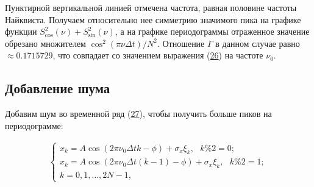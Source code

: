 \documentclass[12pt]{article}
\newcommand{\hl}[1]{(\hyperlink{eq:#1}{#1})}
\newcommand{\sd}[1]{\hypertarget{skip:#1}{\vspace{-10pt}}}
\begin{document}
\vspace{10pt}
\begin{minipage}[h]{\linewidth}
\end{minipage}

\vspace{\baselineskip}

Пунктирной вертикальной линией отмечена частота, равная половине частоты Найквиста. Получаем относительно нее симметрию значимого пика на графике функции $ S_{\cos}^2(\nu) + S_{\sin}^2(\nu) $, а на графике периодограммы отраженное значение обрезано множителем $ \cos^2(\pi \nu \Delta t) / N^2 $. Отношение $ \Gamma $ в данном случае равно $ \approx 0.1715729 $, что совпадает со значением выражения \hl{26} на частоте $ \nu_{0} $.

\subsection{Добавление шума}

Добавим шум во временной ряд \hl{27}, чтобы получить больше пиков на периодограмме:

\sd{29}
\begin{gather}
    \begin{cases}
        x_k = A \cos(2 \pi \nu_{0} \Delta t k - \phi) + \sigma_{x} \xi_{k} , \hspace{8pt} k \% 2 = 0; \\
        x_k = A \cos(2 \pi \nu_{0} \Delta t (k - 1) - \phi) + \sigma_{x} \xi_{k}, \hspace{8pt} k \% 2 = 1; \\
        k = 0, 1, \ldots, 2 N - 1,
    \end{cases}
\end{gather}
\end{document}
